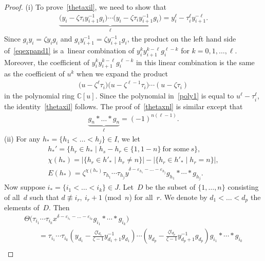 \begin{proof}
(i) To prove~\eqref{thetaxil}, we need to show that
\begin{gather}
\label{eqexpand1}
\underbrace{\big(y_i - \zeta \tau_i y_{i+1}^{-1}g_i\big)
\cdots
\big(y_i - \zeta \tau_i y_{i+1}^{-1}g_i\big)}_\ell = y_i^\ell - \tau_i^\ell y_{i+1}^{-\ell}.
\end{gather}
Since $g_iy_i=\zeta y_i g_i$ and $g_i y_{i+1}^{-1} = \zeta y_{i+1}^{-1} g_i$, the product on the left hand side
of~\eqref{eqexpand1} is a~linear combination of $y_i^k y_{i+1}^{k-\ell} g_i^{\ell-k}$ for $k=0, 1,\ldots, \ell$.
Moreover, the coef\/f\/icient of $y_i^k y_{i+1}^{k-\ell} g_i^{\ell-k}$ in this linear combination is the same as the
coef\/f\/icient of $u^k$ when we expand the product
\begin{gather}
\label{poly1}
\big(u- \zeta^\ell \tau_i\big) \big(u- \zeta^{\ell-1} \tau_i\big) \cdots (u- \zeta \tau_i)
\end{gather}
in the polynomial ring ${\mathbb{C}}[u]$.
Since the polynomial in~\eqref{poly1} is equal to $u^\ell-\tau_i^\ell$, the identity~\eqref{thetaxil} follows.
The proof of~\eqref{thetaxnl} is similar except that
\begin{gather*}
\underbrace{g_n * \dots * g_n}_\ell = (-1)^{n(\ell-1)}.
\end{gather*}
(ii) For any $h_*=\{h_1<\dots<h_j\} \in I$, we let
\begin{gather*}
h_*' = \{h_r\in h_* \mid h_s-h_r \in \{1, 1-n\}\ \text{for some}\ s \},
\\
\chi(h_*) = |\{h_r\in h'_* \mid h_r\neq n \}| - |\{h_r\in h'_* \mid h_r=n \}|,
\\
E(h_*) = \zeta^{\chi (h_*)} \tau_{h_1} \cdots \tau_{h_j} y^{\delta - \varepsilon_{h_1} - \dots - \varepsilon_{h_j}}
g_{h_1} * \cdots * g_{h_j}.
\end{gather*}
Now suppose $i_*=\{i_1<\dots<i_k\}\in J$.
Let~$D$ be the subset of $\{1,\dots,n\}$ consisting of all~$d$ such that $d \not\equiv i_r,\ i_r+1$ (mod~$n$) for all~$r$.
We denote by $d_1 < \dots < d_p$ the elements of~$D$.
Then
\begin{gather*}
\Theta\big(\tau_{i_1}\cdots \tau_{i_k} x^{\delta-\varepsilon_{i_1} - \dots - \varepsilon_{i_k}} g_{i_1}*\cdots * g_{i_k}\big)
\\
\qquad
= \tau_{i_1}\cdots \tau_{i_k} \left(y_{d_1} - \frac{\zeta t_{d_1}}{\zeta-1}y_{d_1+1}^{-1}g_{d_1} \right) \cdots
\left(y_{d_p} - \frac{\zeta t_{d_p}}{\zeta-1}y_{d_p+1}^{-1}g_{d_p} \right) g_{i_1}*\cdots * g_{i_k}
\\

\end{gather*}
\end{proof}
